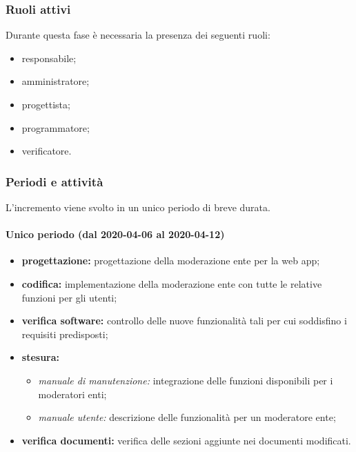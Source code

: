 			\subsubsection{Ruoli attivi}
			
				Durante questa fase è necessaria la presenza dei seguenti ruoli:
				\begin{itemize}
					\item responsabile;
					\item amministratore;
					\item progettista;
					\item programmatore;
					\item verificatore.
				\end{itemize}
			
			\subsubsection{Periodi e attività}
			
				L'incremento viene svolto in un unico periodo di breve durata.
				
				\paragraph{Unico periodo (dal 2020-04-06 al 2020-04-12)}
				
					\begin{itemize}
						\item \textbf{progettazione:} progettazione della moderazione ente per la web app;
						\item \textbf{codifica:} implementazione della moderazione ente con tutte le relative funzioni per gli utenti;
						\item \textbf{verifica software:} controllo delle nuove funzionalità tali per cui soddisfino i requisiti predisposti;
						\item \textbf{stesura:}
						\begin{itemize}
							\item \textit{manuale di manutenzione:} integrazione delle funzioni disponibili per i moderatori enti;
							\item \textit{manuale utente:} descrizione delle funzionalità per un moderatore ente;
						\end{itemize}
						\item \textbf{verifica documenti:} verifica delle sezioni aggiunte nei documenti modificati.
					\end{itemize} 			

